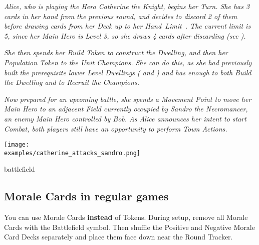 \begin{multicols*}{2}
\textit{Alice, who is playing the Hero Catherine the Knight, begins her Turn.
She has 3 cards in her hand from the previous round, and decides to discard 2 of them before drawing cards from her Deck up to her \mbox{Hand Limit .}
The current limit is 5, since her Main Hero is Level 3, so she draws 4 cards after discarding (see ).}\par
\textit{She then spends her Build Token to construct the  Dwelling, and then her Population Token to  the  Unit Champions.
She can do this, as she had previously built the prerequisite lower Level Dwellings ( and ) and has enough  to both Build the Dwelling and to Recruit the Champions.}\par
\textit{Now prepared for an upcoming battle, she spends a Movement Point to move her Main Hero to an adjacent Field currently occupied by Sandro the Necromancer, an enemy Main Hero controlled by Bob.
As Alice announces her intent to start Combat, both players still have an opportunity to perform Town Actions.}\par

\texttt{[image: \\examples/catherine\_attacks\_sandro.png]}
\vspace*{\fill}
\columnbreak

\begin{expansion}[before=\vspace*{-11mm}]{battlefield}
\subsection*{Morale Cards in regular games}

You can use Morale Cards \textbf{instead} of Tokens.
During setup, remove all Morale Cards with the Battlefield symbol.
Then shuffle the Positive and Negative Morale Card Decks separately and place them face down near the Round Tracker.


\end{expansion}
\end{multicols*}
